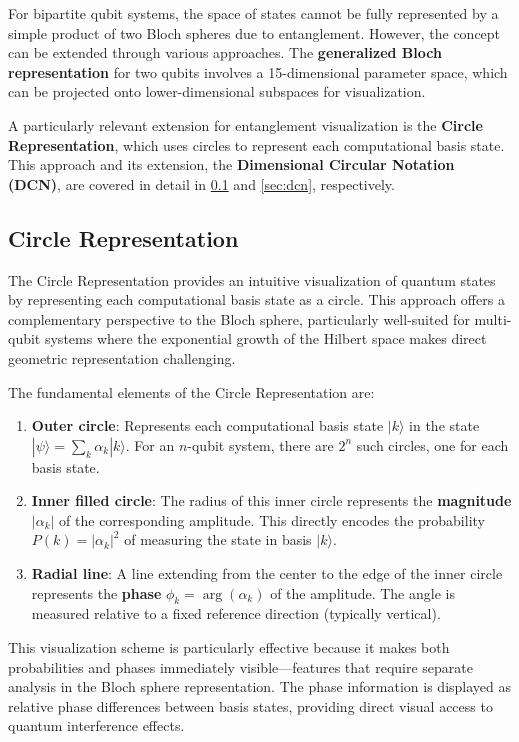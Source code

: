\documentclass[%
 amsmath,amssymb,
 aps,
rmp,
]{revtex4-2}
\begin{document}
For bipartite qubit systems, the space of states cannot be fully represented by a simple product of two Bloch spheres due to entanglement. However, the concept can be extended through various approaches. The \textbf{generalized Bloch representation} for two qubits involves a 15-dimensional parameter space, which can be projected onto lower-dimensional subspaces for visualization.

A particularly relevant extension for entanglement visualization is the \textbf{Circle Representation}, which uses circles to represent each computational basis state. This approach and its extension, the \textbf{Dimensional Circular Notation (DCN)}, are covered in detail in \cref{sec:circle-rep} and \cref{sec:dcn}, respectively.

\subsection{Circle Representation}
\label{sec:circle-rep}

The Circle Representation provides an intuitive visualization of quantum states by representing each computational basis state as a circle. This approach offers a complementary perspective to the Bloch sphere, particularly well-suited for multi-qubit systems where the exponential growth of the Hilbert space makes direct geometric representation challenging.

The fundamental elements of the Circle Representation are:

\begin{enumerate}
	\item \textbf{Outer circle}: Represents each computational basis state $|k\rangle$ in the state $|\psi\rangle = \sum_{k} \alpha_k |k\rangle$. For an $n$-qubit system, there are $2^n$ such circles, one for each basis state.
	\item \textbf{Inner filled circle}: The radius of this inner circle represents the \textbf{magnitude} $|\alpha_k|$ of the corresponding amplitude. This directly encodes the probability $P(k) = |\alpha_k|^2$ of measuring the state in basis $|k\rangle$.
	\item \textbf{Radial line}: A line extending from the center to the edge of the inner circle represents the \textbf{phase} $\phi_k = \arg(\alpha_k)$ of the amplitude. The angle is measured relative to a fixed reference direction (typically vertical).
\end{enumerate}

This visualization scheme is particularly effective because it makes both probabilities and phases immediately visible---features that require separate analysis in the Bloch sphere representation. The phase information is displayed as relative phase differences between basis states, providing direct visual access to quantum interference effects.
\end{document}

